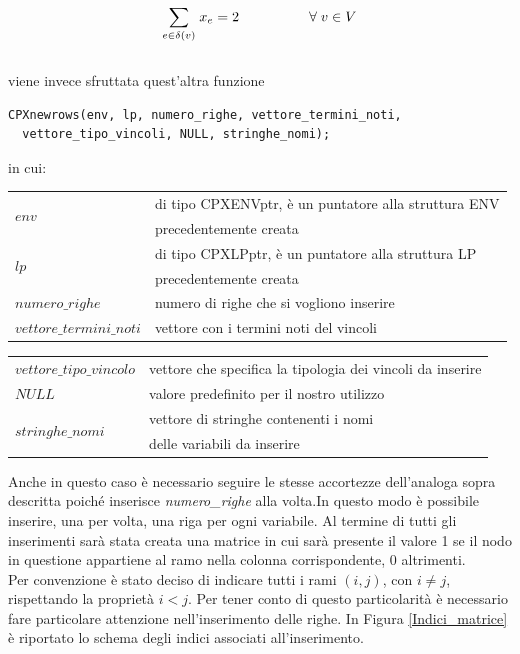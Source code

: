 $$
\underset{e\in \delta(v)}\sum{\;x_e} = 2\;\;\;\;\;\;\;\;\;\;\;\;\;\;\;\;\;\;\forall\;v\in V \\\\
$$
\\
viene invece sfruttata quest'altra funzione 

\begin{lstlisting}[linewidth=350pt, basicstyle=\footnotesize\sffamily,]     
 CPXnewrows(env, lp, numero_righe, vettore_termini_noti,
  vettore_tipo_vincoli, NULL, stringhe_nomi);
\end{lstlisting}

in cui:

\begin{table}[h]
\begin{tabular}{ll}
\multirow{2}{*}{$env$} & di tipo CPXENVptr, è un puntatore alla struttura ENV  \\
                  & precedentemente creata \\
\multirow{2}{*}{$lp$} & di tipo CPXLPptr, è un puntatore alla struttura LP  \\
                  & precedentemente creata \\
$numero\_righe$ & numero di righe che si vogliono inserire \\
$vettore\_termini\_noti$ & vettore con i termini noti del vincoli \\
\end{tabular}
\end{table}
\begin{table}[h]
\begin{tabular}{ll}    
$vettore\_tipo\_vincolo$ & vettore che specifica la tipologia dei vincoli da inserire \\
$NULL$ & valore predefinito per il nostro utilizzo \\
\multirow{2}{*}{$stringhe\_nomi$} & vettore di stringhe contenenti i nomi  \\
                  & delle variabili da inserire
\end{tabular}
\end{table}
Anche in questo caso è necessario seguire le stesse accortezze dell'analoga sopra descritta poiché inserisce \textit{numero\_righe} alla volta.In questo modo è possibile inserire, una per volta, una riga per ogni variabile. Al termine di tutti gli inserimenti sarà stata creata una matrice in cui sarà presente il valore 1 se il nodo in questione appartiene al ramo nella colonna corrispondente, 0 altrimenti.\\
Per convenzione è stato deciso di indicare tutti i rami $(i,j)$, con $i\neq j$, rispettando la proprietà $i<j$. Per tener conto di questo particolarità è necessario fare particolare attenzione nell'inserimento delle righe. In Figura \ref{Indici_matrice} è riportato lo schema degli indici associati all'inserimento.\\

